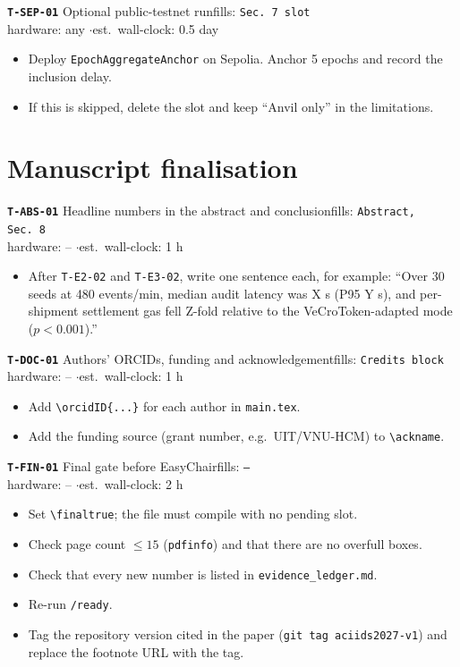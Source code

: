 \documentclass[10pt,a4paper]{article}
\newcommand{\task}[6]{%
\par\medskip\noindent\colorbox{blue!8}{\parbox{\dimexpr\linewidth-2\fboxsep}{%
\textbf{\texttt{#1}} \enspace #2\hfill{\small fills: \texttt{#3}}\\
{\small hardware: #4 \quad$\cdot$\quad est.\ wall-clock: #5}}}\par
\begin{itemize}#6\end{itemize}}
\begin{document}
\task{T-SEP-01}{Optional public-testnet run}{Sec.~7 slot}{any}{0.5 day}{
\item Deploy \texttt{EpochAggregateAnchor} on Sepolia. Anchor 5 epochs and record the inclusion delay.
\item If this is skipped, delete the slot and keep ``Anvil only'' in the limitations.
}

\section{Manuscript finalisation}

\task{T-ABS-01}{Headline numbers in the abstract and conclusion}{Abstract, Sec.~8}{--}{1 h}{
\item After \texttt{T-E2-02} and \texttt{T-E3-02}, write one sentence each, for example: ``Over 30 seeds at 480 events/min, median audit latency was X s (P95 Y s), and per-shipment settlement gas fell Z-fold relative to the VeCroToken-adapted mode ($p<0.001$).''
}

\task{T-DOC-01}{Authors' ORCIDs, funding and acknowledgement}{Credits block}{--}{1 h}{
\item Add \texttt{\textbackslash orcidID\{...\}} for each author in \texttt{main.tex}.
\item Add the funding source (grant number, e.g.\ UIT/VNU-HCM) to \texttt{\textbackslash ackname}.
}

\task{T-FIN-01}{Final gate before EasyChair}{--}{--}{2 h}{
\item Set \texttt{\textbackslash finaltrue}; the file must compile with no pending slot.
\item Check page count $\le15$ (\texttt{pdfinfo}) and that there are no overfull boxes.
\item Check that every new number is listed in \texttt{evidence\_ledger.md}.
\item Re-run \texttt{/ready}.
\item Tag the repository version cited in the paper (\texttt{git tag aciids2027-v1}) and replace the footnote URL with the tag.
}
\end{document}
